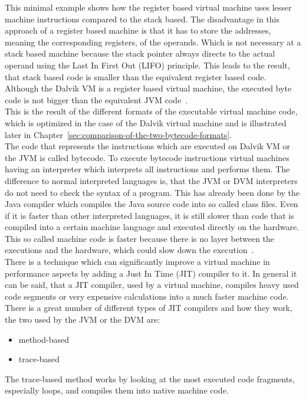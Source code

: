 This minimal example shows how the register based virtual machine uses lesser machine instructions compared to the stack based.
The disadvantage in this approach of a register based machine is that it has to store the addresses, meaning the corresponding registers, of the operands.
Which is not necessary at a stack based machine because the stack pointer always directs to the actual operand using the Last In First Out (LIFO) principle.
This leads to the result, that stack based code is smaller than the equivalent register based code.
Although the Dalvik VM is a register based virtual machine, the executed byte code is not bigger than the equivalent JVM code~\cite{shi2008virtual}.\\
This is the result of the different formats of the executable virtual machine code, which is optimized in the case of the Dalvik virtual machine and is illustrated later in Chapter~\ref{sec:comparison-of-the-two-bytecode-formats}.
\\
The code that represents the instructions which are executed on Dalvik VM or the JVM is called bytecode.
To execute bytecode instructions virtual machines having an interpreter which interprets all instructions and performs them.
The difference to normal interpreted languages is, that the JVM or DVM interpreters do not need to check the syntax of a program.
This has already been done by the Java compiler which compiles the Java source code into so called class files.
Even if it is faster than other interpreted languages, it is still slower than code that is compiled into a certain machine language and executed directly on the hardware.
This so called machine code is faster because there is no layer between the executions and the hardware, which could slow down the execution~\cite{aycock2003brief}.\\
There is a technique which can significantly improve a virtual machine in performance aspects by adding a Just In Time (JIT) compiler to it.
In general it can be said, that a JIT compiler, used by a virtual machine, compiles heavy used code segments or very expensive calculations into a much faster machine code.
There is a great number of different types of JIT compilers and how they work, the two used by the JVM or the DVM are:
\begin{itemize}
\item method-based
\item trace-based
\end{itemize}
The trace-based method works by looking at the most executed code fragments, especially loops, and compiles them into native machine code.\\

